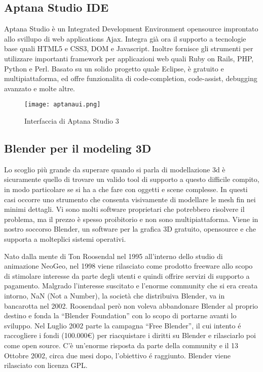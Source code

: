 \subsection{Aptana Studio IDE}
Aptana Studio è un Integrated Development Environment opensource improntato allo svillupo di web applications Ajax. Integra già ora il supporto a tecnologie base quali HTML5 e CSS3, DOM e Javascript. Inoltre fornisce gli strumenti per utilizzare importanti framework per applicazioni web quali Ruby on Rails, PHP, Python e Perl. Basato su un solido progetto quale Eclipse, è gratuito e multipiattaforma, ed offre funzionalita di code-completion, code-assist, debugging avanzato e molte altre. 

\begin{figure}[Ht]
\centering
\texttt{[image: aptanaui.png]}
\caption{Interfaccia di Aptana Studio 3}
\label{label:aptanaui}
\end{figure}

\subsection{Blender per il modeling 3D}
Lo scoglio più grande da superare quando si parla di modellazione 3d è sicuramente quello di trovare un valido tool di supporto a questo difficile compito, in modo particolare se si ha a che fare con oggetti e scene complesse. In questi casi occorre uno strumento che consenta visivamente di modellare le mesh fin nei minimi dettagli. Vi sono molti software proprietari che potrebbero risolvere il problema, ma il prezzo è spesso proibitorio e non sono multipiattaforma. Viene in nostro soccorso Blender, un software per la grafica 3D gratuito, opensource e che supporta a molteplici sistemi operativi.

Nato dalla mente di Ton Roosendal nel 1995 all'interno dello studio di animazione NeoGeo, nel 1998 viene rilasciato come prodotto freeware allo scopo di stimolare interesse da parte degli utenti e quindi offrire servizi di supporto a pagamento. Malgrado l'interesse suscitato e l'enorme community che si era creata intorno, NaN (Not a Number), la società che distribuiva Blender, va in bancarotta nel 2002. Roosendaal però non voleva abbandonare Blender al proprio destino e fonda la “Blender Foundation” con lo scopo di  portarne avanti lo sviluppo. Nel Luglio 2002 parte la campagna “Free Blender”, il cui intento é raccogliere i fondi (100.000\euro) per riacquistare i diritti su Blender e rilasciarlo poi come open source. C'è un'enorme risposta da parte della community e il 13 Ottobre 2002, circa due mesi dopo, l'obiettivo é raggiunto. Blender viene rilasciato con licenza GPL.

